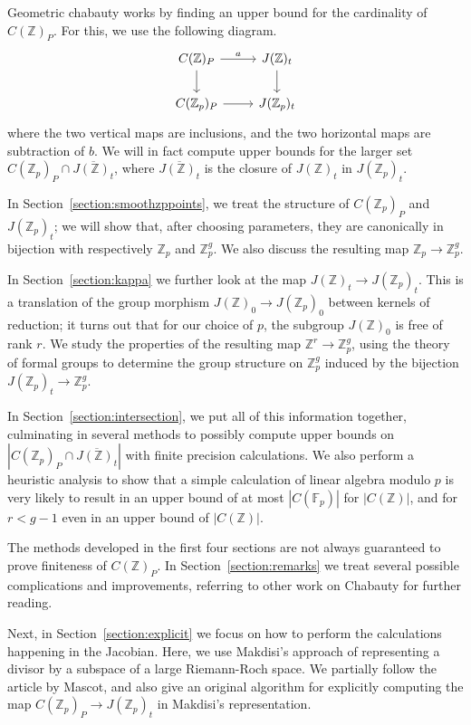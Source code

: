 \documentclass[12pt]{article}
\newcommand{\Z}{\mathbb{Z}}
\newcommand{\F}{\mathbb{F}}
\theoremstyle{plain}
\theoremstyle{definition}
\theoremstyle{remark}
\begin{document}
Geometric chabauty works by finding an upper bound for the cardinality of $C(\Z)_P$. For this, we use the following diagram.
\[
\begin{tikzcd}
C(\Z)_P \arrow[d] \arrow[r, "a"] & J(\Z)_t \arrow[d] \\
C(\Z_p)_P \arrow[r]              & J(\Z_p)_t        
\end{tikzcd}
\]
where the two vertical maps are inclusions, and the two horizontal maps are subtraction of $b$. We will in fact compute upper bounds for the larger set $C(\Z_p)_P \cap \overline{J(\Z)_t}$, where $\overline{J(\Z)_t}$ is the closure of $J(\Z)_t$ in $J(\Z_p)_t$. 

In Section~\ref{section:smoothzppoints}, we treat the structure of $C(\Z_p)_P$ and $J(\Z_p)_t$; we will show that, after choosing parameters, they are canonically in bijection with respectively $\Z_p$ and $\Z_p^g$. We also discuss the resulting map $\Z_p \to \Z_p^g$.

In Section~\ref{section:kappa} we further look at the map $J(\Z)_t \to J(\Z_p)_t$. This is a translation of the group morphism $J(\Z)_0 \to J(\Z_p)_0$ between kernels of reduction; it turns out that for our choice of $p$, the subgroup $J(\Z)_0$ is free of rank $r$. We study the properties of the resulting map $\Z^r \to \Z_p^g$, using the theory of formal groups to determine the group structure on $\Z_p^g$ induced by the bijection $J(\Z_p)_t \to \Z_p^g$.

In Section~\ref{section:intersection}, we put all of this information together, culminating in several methods to possibly compute upper bounds on $\left|C(\Z_p)_P \cap \overline{J(\Z)_t}\right|$ with finite precision calculations. We also perform a heuristic analysis to show that a simple calculation of linear algebra modulo $p$ is very likely to result in an upper bound of at most $|C(\F_p)|$ for $|C(\Z)|$, and for $r < g-1$ even in an upper bound of $|C(\Z)|$.

The methods developed in the first four sections are not always guaranteed to prove finiteness of $C(\Z)_P$. In Section~\ref{section:remarks} we treat several possible complications and improvements, referring to other work on Chabauty for further reading.

Next, in Section~\ref{section:explicit} we focus on how to perform the calculations happening in the Jacobian. Here, we use Makdisi's approach of representing a divisor by a subspace of a large Riemann-Roch space. We partially follow the article \cite{mascot18} by Mascot, and also give an original algorithm for explicitly computing the map $C(\Z_p)_P \to J(\Z_p)_t$ in Makdisi's representation.
\end{document}
